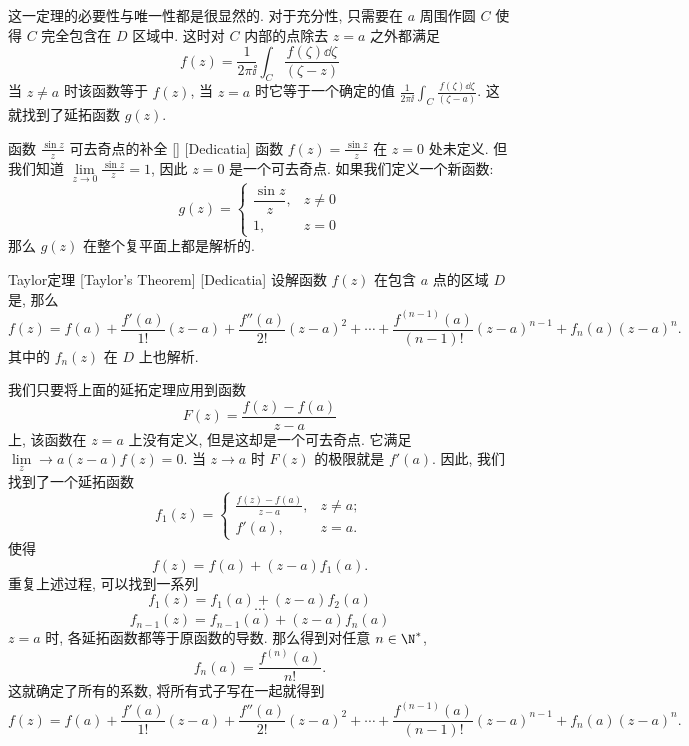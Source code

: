 \documentclass[UTF8]{ctexart}
\begin{document}
        \begin{prf}
            这一定理的必要性与唯一性都是很显然的. 对于充分性, 只需要在 \(a\) 周围作圆 \(C\) 使得 \(C\) 完全包含在 \(D\) 区域中. 这时对 \(C\) 内部的点除去 \(z=a\) 之外都满足
            \[f(z)=\frac{1}{2\pi\ii}\int_C \frac{f(\zeta)\dd{\zeta}}{(\zeta-z)}\]
            当 \(z\neq a\) 时该函数等于 \(f(z)\), 当 \(z=a\) 时它等于一个确定的值 \(\frac{1}{2\pi\ii}\int_C \frac{f(\zeta)\dd{\zeta}}{(\zeta-a)}\). 这就找到了延拓函数 \(g(z)\).
        \end{prf}

        \begin{xmp}
            [UUID]
            {函数 \(\frac{\sin z}{z}\) 可去奇点的补全}
            []
            [Dedicatia]
            函数 \(f(z) = \frac{\sin z}{z}\) 在 \(z = 0\) 处未定义. 但我们知道 \(\lim\limits_{z \to 0} \frac{\sin z}{z} = 1\), 因此 \(z=0\) 是一个可去奇点. 如果我们定义一个新函数: 
            \[
            g(z) = \begin{cases}
            \dfrac{\sin z}{z}, & z \neq 0 \\
            1, & z = 0
            \end{cases}
            \]
            那么 \(g(z)\) 在整个复平面上都是解析的. 
        \end{xmp}

        \begin{thm}
            [Taylor]
            {Taylor定理\label{thm:Taylor}}
            [Taylor's Theorem]
            [Dedicatia]
            设解函数 \(f(z)\) 在包含 \(a\) 点的区域 \(D\) 是, 那么
            \[f(z)=f(a)+\frac{f'(a)}{1!}(z-a)+\frac{f''(a)}{2!}(z-a)^2+\cdots+\frac{f^{(n-1)}(a)}{(n-1)!}(z-a)^{n-1}+f_n(a)(z-a)^n.\]
            其中的 \(f_n(z)\) 在 \(D\) 上也解析. 
        \end{thm}

        \begin{prf}
            我们只要将上面的延拓定理应用到函数
            \[F(z)=\frac{f(z)-f(a)}{z-a}\]
            上, 该函数在 \(z=a\) 上没有定义, 但是这却是一个可去奇点. 它满足 \(\lim\limits_z\to a(z-a)f(z)=0\). 当 \(z\to a\) 时 \(F(z)\) 的极限就是 \(f'(a)\). 因此, 我们找到了一个延拓函数
            \[f_1(z)=\begin{cases}
                \frac{f(z)-f(a)}{z-a}, & z\neq a;\\
                f'(a), &z=a.
            \end{cases}\]
            使得
            \[f(z)=f(a)+(z-a)f_1(a).\]
            重复上述过程, 可以找到一系列
            \[f_1(z)=f_1(a)+(z-a)f_2(a)\]
            \[\cdots\]
            \[f_{n-1}(z)=f_{n-1}(a)+(z-a)f_n(a)\]
            \(z=a\) 时, 各延拓函数都等于原函数的导数. 那么得到对任意 \(n\in\N^*\),
            \[f_n(a)=\frac{f^{(n)}(a)}{n!}.\]
            这就确定了所有的系数, 将所有式子写在一起就得到
            \[f(z)=f(a)+\frac{f'(a)}{1!}(z-a)+\frac{f''(a)}{2!}(z-a)^2+\cdots+\frac{f^{(n-1)}(a)}{(n-1)!}(z-a)^{n-1}+f_n(a)(z-a)^n.\]
        \end{prf}
\end{document}
